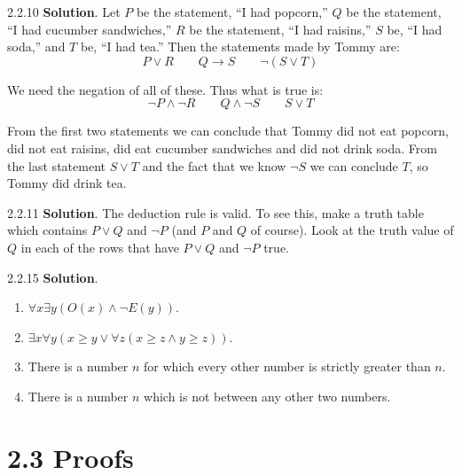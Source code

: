 \documentclass[11pt,]{book}
\theoremstyle{ptxplainnotitle}
\theoremstyle{ptxplaintitle}
\theoremstyle{ptxdefinitionnotitle}
\theoremstyle{ptxdefinitiontitle}
\theoremstyle{ptxdefinitionnotitle}
\theoremstyle{ptxdefinitiontitle}
\theoremstyle{ptxdefinitionnotitle}
\theoremstyle{ptxdefinitiontitle}
\theoremstyle{ptxdefinitiontitlenonumber}
\theoremstyle{ptxdefinitiontitlenonumber}
\numberwithin{equation}{chapter}
\newcommand{\imp}{\rightarrow}
\begin{document}
\begin{divisionexercise}{2.2.10}
\textbf{Solution}.\quad%
\hypertarget{p-2484}{}%
Let \(P\) be the statement, ``I had popcorn,'' \(Q\) be the statement, ``I had cucumber sandwiches,'' \(R\) be the statement, ``I had raisins,'' \(S\) be, ``I had soda,'' and \(T\) be, ``I had tea.'' Then the statements made by Tommy are:%
\begin{equation*}
P \vee R \qquad Q \imp S \qquad \neg(S \vee T)
\end{equation*}
%
\par
\hypertarget{p-2485}{}%
We need the negation of all of these. Thus what is true is:%
\begin{equation*}
\neg P \wedge \neg R \qquad Q \wedge \neg S \qquad S \vee T
\end{equation*}
%
\par
\hypertarget{p-2486}{}%
From the first two statements we can conclude that Tommy did not eat popcorn, did not eat raisins, did eat cucumber sandwiches and did not drink soda. From the last statement \(S \vee T\) and the fact that we know \(\neg S\) we can conclude \(T\), so Tommy did drink tea.%
\end{divisionexercise}%
\begin{divisionexercise}{2.2.11}
\textbf{Solution}.\quad%
\hypertarget{p-2488}{}%
The deduction rule is valid. To see this, make a truth table which contains \(P \vee Q\) and \(\neg P\) (and \(P\) and \(Q\) of course). Look at the truth value of \(Q\) in each of the rows that have \(P \vee Q\) and \(\neg P\) true.%
\end{divisionexercise}%
\begin{divisionexercise}{2.2.15}
\textbf{Solution}.\quad%
\hypertarget{p-2500}{}%
\leavevmode%
\begin{enumerate}[label=(\alph*)]
\item\hypertarget{li-1277}{}\(\forall x \exists y (O(x) \wedge \neg E(y))\).%
\item\hypertarget{li-1278}{}\(\exists x \forall y (x \ge y \vee \forall z (x \ge z \wedge y \ge z))\).%
\item\hypertarget{li-1279}{}\hypertarget{p-2501}{}%
There is a number \(n\) for which every other number is strictly greater than \(n\).%
\item\hypertarget{li-1280}{}\hypertarget{p-2502}{}%
There is a number \(n\) which is not between any other two numbers.%
\end{enumerate}
%
\end{divisionexercise}%
\section*{2.3 Proofs}
\end{document}
